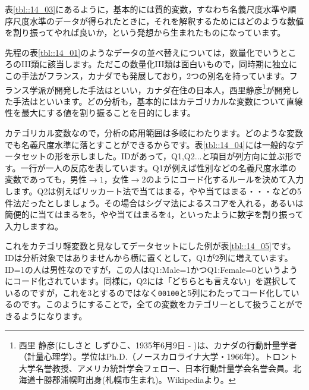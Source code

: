 \documentclass{ltjsbook}
\begin{document}
表\ref{tbl::14_03}にあるように，基本的には質的変数，すなわち名義尺度水準や順序尺度水準のデータが得られたときに，それを解釈するためにはどのような数値を割り振ってやれば良いか，という発想から生まれたものになっています。

先程の表\ref{tbl::14_01}のようなデータの並べ替えについては，数量化でいうところのIII類に該当します。ただこの数量化III類は面白いもので，同時期に独立にこの手法がフランス，カナダでも発展しており，2つの別名を持っています。フランス学派が開発した手法はといい，カナダ在住の日本人，西里静彦\footnote{西里 静彦(にしさと しずひこ、1935年6月9日 - )は、カナダの行動計量学者（計量心理学）。学位はPh.D.（ノースカロライナ大学・1966年）。トロント大学名誉教授、アメリカ統計学会フェロー、日本行動計量学会名誉会員。北海道十勝郡浦幌町出身(札幌市生まれ)。Wikipediaより。}が開発した手法はといいます。どの分析も，基本的にはカテゴリカルな変数について直線性を最大にする値を割り振ることを目的にします。

カテゴリカル変数なので，分析の応用範囲は多岐にわたります。どのような変数でも名義尺度水準に落とすことができるからです。表\ref{tbl::14_04}には一般的なデータセットの形を示しました。IDがあって，Q1,Q2...と項目が列方向に並ぶ形です。一行が一人の反応を表しています。Q1が例えば性別などの名義尺度水準の変数であっても，男性$\to1$，女性$\to2$のようにコード化するルールを決めて入力します。Q2は例えばリッカート法で当てはまる，やや当てはまる・・・などの5件法だったとしましょう。その場合はシグマ法によるスコアを入れる，あるいは簡便的に当てはまるを5，やや当てはまるを4，といったように数字を割り振って入力しますね。

これをカテゴリ軽変数と見なしてデータセットにした例が表\ref{tbl::14_05}です。IDは分析対象ではありませんから横に置くとして，Q1が2列に増えています。ID=1の人は男性なのですが，この人はQ1:Male=1かつQ1:Female=0というようにコード化されています。同様に，Q2には「どちらとも言えない」を選択しているのですが，これを3とするのではなく\texttt{00100}と5列にわたってコード化しているのです。このようにすることで，全ての変数をカテゴリーとして扱うことができるようになります。
\end{document}
